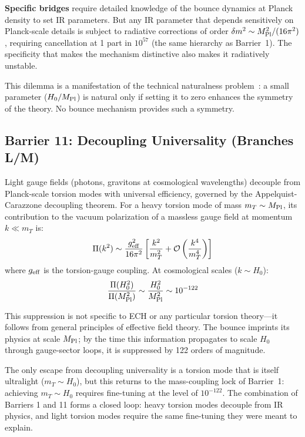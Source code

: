 \documentclass[aps,prd,twocolumn,superscriptaddress,showpacs,preprintnumbers,nofootinbib,longbibliography,floatfix]{revtex4-2}
\newcommand{\MPl}{M_{\rm Pl}}
\begin{document}
\textbf{Specific bridges} require detailed knowledge of the bounce dynamics at Planck density to set IR parameters. But any IR parameter that depends sensitively on Planck-scale details is subject to radiative corrections of order $\delta m^2 \sim \MPl^2/(16\pi^2)$, requiring cancellation at 1 part in $10^{57}$ (the same hierarchy as Barrier~1). The specificity that makes the mechanism distinctive also makes it radiatively unstable.

This dilemma is a manifestation of the technical naturalness problem~\cite{tHooft:1979nat}: a small parameter ($H_0/\MPl$) is natural only if setting it to zero enhances the symmetry of the theory. No bounce mechanism provides such a symmetry.

\subsection{Barrier 11: Decoupling Universality (Branches L/M)}

Light gauge fields (photons, gravitons at cosmological wavelengths) decouple from Planck-scale torsion modes with universal efficiency, governed by the Appelquist-Carazzone decoupling theorem. For a heavy torsion mode of mass $m_T \sim \MPl$, its contribution to the vacuum polarization of a massless gauge field at momentum $k \ll m_T$ is:
\begin{equation}
\Pi(k^2) \sim \frac{g_{\rm eff}^2}{16\pi^2}\left[\frac{k^2}{m_T^2} + \mathcal{O}\left(\frac{k^4}{m_T^4}\right)\right]
\end{equation}
where $g_{\rm eff}$ is the torsion-gauge coupling. At cosmological scales ($k \sim H_0$):
\begin{equation}
\frac{\Pi(H_0^2)}{\Pi(\MPl^2)} \sim \frac{H_0^2}{\MPl^2} \sim 10^{-122}
\end{equation}

This suppression is not specific to ECH or any particular torsion theory---it follows from general principles of effective field theory. The bounce imprints its physics at scale $\MPl$; by the time this information propagates to scale $H_0$ through gauge-sector loops, it is suppressed by 122 orders of magnitude.

The only escape from decoupling universality is a torsion mode that is itself ultralight ($m_T \sim H_0$), but this returns to the mass-coupling lock of Barrier~1: achieving $m_T \sim H_0$ requires fine-tuning at the level of $10^{-122}$. The combination of Barriers 1 and 11 forms a closed loop: heavy torsion modes decouple from IR physics, and light torsion modes require the same fine-tuning they were meant to explain.
\end{document}
